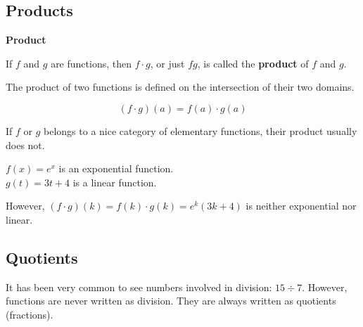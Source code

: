 \documentclass{ximera}
\begin{document}
\subsection*{Products}



\begin{template}  \textbf{\textcolor{blue!55!black}{Product}} 


If  $f$ and $g$ are functions, then $f \cdot g$, or just $f g$, is called the \textbf{product} of $f$ and $g$. 

The product of two functions is defined on the intersection of their two domains. 


\[ (f \cdot g)(a) = f(a) \cdot g(a)  \]



\end{template}



\begin{warning}

If $f$ or $g$ belongs to a nice category of elementary functions, their product usually does not.

\end{warning}





\begin{example}

$f(x) = e^x$ is an exponential function. \\
$g(t) = 3 t + 4$ is a linear function. 

However, $(f \cdot g)(k) = f(k) \cdot g(k) = e^k (3 k + 4)$ is neither exponential nor linear.

\end{example}























\subsection*{Quotients}



It has been very common to see numbers involved in division: $15 \div 7$. However, functions are never written as division. They are always written as quotients (fractions).
\end{document}
